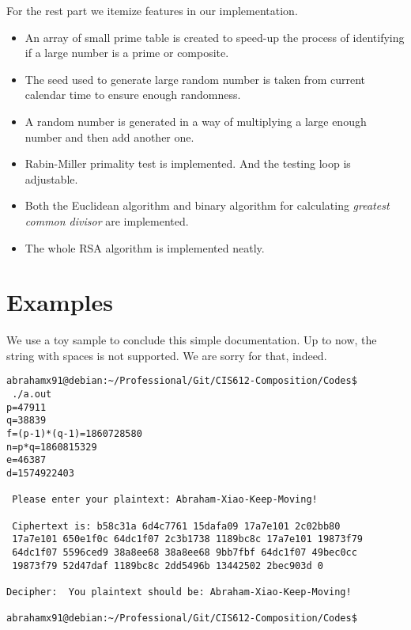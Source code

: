 \documentclass[12pt]{article}
\begin{document}
For the rest part we itemize features in our implementation.
\begin{itemize}
\item An array of small prime table is created to speed-up the process
  of identifying if a large number is a prime or composite.
\item The seed used to generate large random number is taken from
  current calendar time to ensure enough randomness. 
\item A random number is generated in a way of multiplying a large
  enough number and then add another one.
\item Rabin-Miller primality test is implemented. And the testing loop
  is adjustable.
\item Both the Euclidean algorithm and binary algorithm for
  calculating \emph{greatest common divisor} are implemented.
\item The whole RSA algorithm is implemented neatly.
\end{itemize}


\section{Examples}
\label{sec:examples}

We use a toy sample to conclude this simple documentation. Up to now,
the string with spaces is not supported. We are sorry for that,
indeed.
\begin{Verbatim}[showspaces=true]
abrahamx91@debian:~/Professional/Git/CIS612-Composition/Codes$
 ./a.out 
p=47911
q=38839
f=(p-1)*(q-1)=1860728580
n=p*q=1860815329
e=46387
d=1574922403

 Please enter your plaintext: Abraham-Xiao-Keep-Moving!

 Ciphertext is: b58c31a 6d4c7761 15dafa09 17a7e101 2c02bb80 
 17a7e101 650e1f0c 64dc1f07 2c3b1738 1189bc8c 17a7e101 19873f79 
 64dc1f07 5596ced9 38a8ee68 38a8ee68 9bb7fbf 64dc1f07 49bec0cc 
 19873f79 52d47daf 1189bc8c 2dd5496b 13442502 2bec903d 0 

Decipher:  You plaintext should be: Abraham-Xiao-Keep-Moving!

abrahamx91@debian:~/Professional/Git/CIS612-Composition/Codes$ 

\end{Verbatim}
\end{document}
